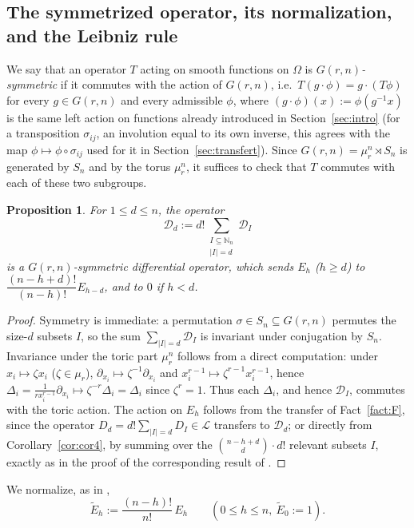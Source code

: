 \documentclass[11pt]{article}
\newtheorem{proposition}[theorem]{Proposition}
\theoremstyle{remark}
\newcommand{\NN}{\mathbb{N}}
\begin{document}
\subsection{The symmetrized operator, its normalization, and the Leibniz rule}

We say that an operator $T$ acting on smooth functions on $\Omega$ is \emph{$G(r,n)$-symmetric} if it commutes with the action of $G(r,n)$, i.e.\ $T(g\cdot\phi)=g\cdot(T\phi)$ for every $g\in G(r,n)$ and every admissible $\phi$, where $(g\cdot\phi)(x):=\phi(g^{-1}x)$ is the same left action on functions already introduced in Section~\ref{sec:intro} (for a transposition $\sigma_{ij}$, an involution equal to its own inverse, this agrees with the map $\phi\mapsto\phi\circ\sigma_{ij}$ used for it in Section~\ref{sec:transfert}). Since $G(r,n)=\mu_r^n\rtimes S_n$ is generated by $S_n$ and by the torus $\mu_r^n$, it suffices to check that $T$ commutes with each of these two subgroups.

\begin{proposition}\label{prop:prop6}
For $1\le d\le n$, the operator
\[
\mathcal D_d := d!\sum_{\substack{I\subseteq\NN_n\\ |I|=d}} \mathcal D_I
\]
is a $G(r,n)$-symmetric differential operator, which sends $E_h$ ($h\ge d$) to $\dfrac{(n-h+d)!}{(n-h)!}E_{h-d}$, and to $0$ if $h<d$.
\end{proposition}

\begin{proof}
Symmetry is immediate: a permutation $\sigma\in S_n\subseteq G(r,n)$ permutes the size-$d$ subsets $I$, so the sum $\sum_{|I|=d}\mathcal D_I$ is invariant under conjugation by $S_n$. Invariance under the toric part $\mu_r^n$ follows from a direct computation: under $x_i\mapsto\zeta x_i$ ($\zeta\in\mu_r$), $\partial_{x_i}\mapsto\zeta^{-1}\partial_{x_i}$ and $x_i^{r-1}\mapsto\zeta^{r-1}x_i^{r-1}$, hence $\Delta_i=\frac{1}{rx_i^{r-1}}\partial_{x_i}\mapsto \zeta^{-r}\Delta_i=\Delta_i$ since $\zeta^r=1$. Thus each $\Delta_i$, and hence $\mathcal D_I$, commutes with the toric action. The action on $E_h$ follows from the transfer of Fact~\ref{fact:F}, since the operator $D_d=d!\sum_{|I|=d}D_I\in\mathcal L$ transfers to $\mathcal D_d$; or directly from Corollary~\ref{cor:cor4}, by summing over the $\binom{n-h+d}{d}\cdot d!$ relevant subsets $I$, exactly as in the proof of the corresponding result of \cite{Ze}.
\end{proof}

We normalize, as in \cite{Ze},
\[
\widetilde E_h := \frac{(n-h)!}{n!}\,E_h \qquad (0\le h\le n,\ \widetilde E_0:=1).
\]
\end{document}

